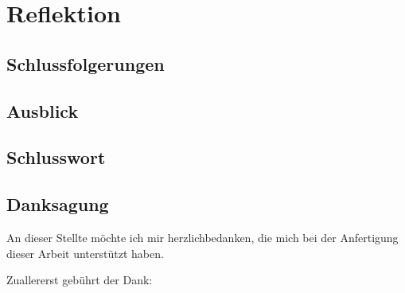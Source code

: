 \chapter{Reflektion}

\section{Schlussfolgerungen}

\section{Ausblick}

\section{Schlusswort}


\section{Danksagung}
An dieser Stellte möchte ich mir herzlichbedanken, die mich bei der Anfertigung dieser Arbeit unterstützt haben.

Zuallererst gebührt der Dank: 